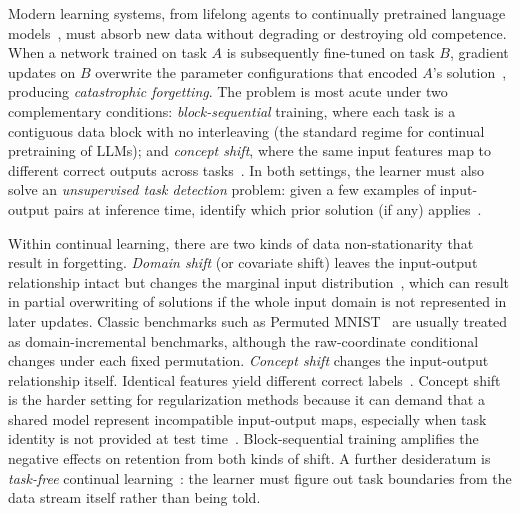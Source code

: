 \documentclass{article}
\begin{document}
Modern learning systems, from lifelong agents to continually pretrained language models~\citep{gururangan2020dontstop,yildiz2024investigating}, must absorb new data without degrading or destroying old competence. When a network trained on task $A$ is subsequently fine-tuned on task $B$, gradient updates on $B$ overwrite the parameter configurations that encoded $A$'s solution~\citep{mccloskey1989catastrophic,french1999catastrophic}, producing \emph{catastrophic forgetting}. The problem is most acute under two complementary conditions: \emph{block-sequential} training, where each task is a contiguous data block with no interleaving (the standard regime for continual pretraining of LLMs); and \emph{concept shift}, where the same input features map to different correct outputs across tasks~\citep{gama2014concept,morenotorres2012unifying}. In both settings, the learner must also solve an \emph{unsupervised task detection} problem: given a few examples of input-output pairs at inference time, identify which prior solution (if any) applies~\citep{aljundi2019taskfree}.

Within continual learning, there are two kinds of data non-stationarity that result in forgetting. \emph{Domain shift} (or covariate shift) leaves the input-output relationship intact but changes the marginal input distribution~\citep{quinonero2009dataset,morenotorres2012unifying}, which can result in partial overwriting of solutions if the whole input domain is not represented in later updates. Classic benchmarks such as Permuted MNIST~\citep{goodfellow2013empirical,kirkpatrick2017overcoming,van2019three} are usually treated as domain-incremental benchmarks, although the raw-coordinate conditional changes under each fixed permutation. \emph{Concept shift} changes the input-output relationship itself. Identical features yield different correct labels~\citep{gama2014concept,morenotorres2012unifying}. Concept shift is the harder setting for regularization methods because it can demand that a shared model represent incompatible input-output maps, especially when task identity is not provided at test time~\citep{van2019three}. Block-sequential training amplifies the negative effects on retention from both kinds of shift. A further desideratum is \emph{task-free} continual learning~\citep{aljundi2019taskfree,parisi2019continual,van2019three}: the learner must figure out task boundaries from the data stream itself rather than being told.
\end{document}
